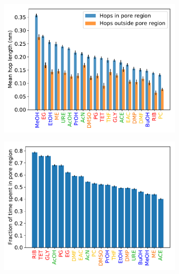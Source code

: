 \documentclass[journal=jpcbfk,manuscript=article]{achemso}
\begin{document}
  \begin{figure}
  \centering
  \begin{subfigure}{0.325\textwidth}
  \includegraphics[width=\linewidth]{hop_length.pdf}
  \caption{}\label{fig:hop_lengths}
  \end{subfigure}
  \begin{subfigure}{0.325\textwidth}
  \includegraphics[width=\textwidth]{frac_time_spent.pdf}
  \caption{}\label{fig:frac_time}
  \end{subfigure}
  \begin{subfigure}{0.325\textwidth}

\end{subfigure}
\end{figure}
\end{document}
